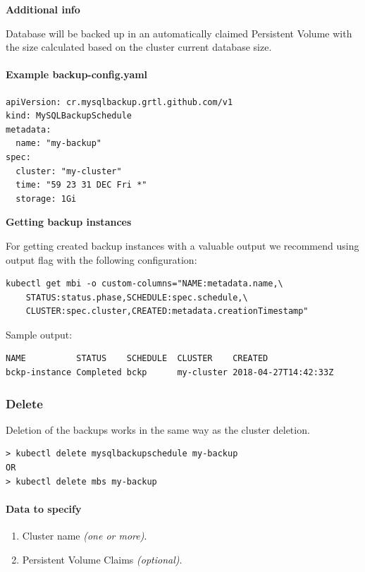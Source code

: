 \noindent  \textbf{Additional info}

\noindent Database will be backed up in an automatically claimed Persistent Volume with the size
calculated based on the cluster current database size.

\paragraph{Example \textbf{backup-config.yaml}}
\begin{lstlisting}[caption=backup-config.yaml,captionpos=b]
apiVersion: cr.mysqlbackup.grtl.github.com/v1
kind: MySQLBackupSchedule
metadata:
  name: "my-backup"
spec:
  cluster: "my-cluster"
  time: "59 23 31 DEC Fri *"
  storage: 1Gi
\end{lstlisting}

\noindent  \textbf{Getting backup instances}

\noindent For getting created backup instances with a valuable output we recommend
using output flag with the following configuration:

\begin{lstlisting}
kubectl get mbi -o custom-columns="NAME:metadata.name,\
	STATUS:status.phase,SCHEDULE:spec.schedule,\
	CLUSTER:spec.cluster,CREATED:metadata.creationTimestamp"
\end{lstlisting}

\noindent Sample output:
\begin{lstlisting}
NAME          STATUS    SCHEDULE  CLUSTER    CREATED
bckp-instance Completed bckp      my-cluster 2018-04-27T14:42:33Z
\end{lstlisting}

\subsubsection*{Delete}

Deletion of the backups works in the same way as the cluster deletion.

\begin{lstlisting}
> kubectl delete mysqlbackupschedule my-backup
OR
> kubectl delete mbs my-backup
\end{lstlisting}

\paragraph{Data to specify}
\begin{enumerate}
	\item Cluster name \textit{(one or more)}.
	\item Persistent Volume Claims \textit{(optional)}.
\end{enumerate}

